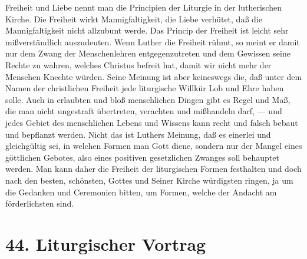 Freiheit und Liebe nennt man die Principien der Liturgie in der lutherischen Kirche. Die Freiheit wirkt Mannigfaltigkeit, die Liebe verhütet, daß die Mannigfaltigkeit nicht allzubunt werde. Das Princip der Freiheit ist leicht
sehr mißverständlich auszudeuten. Wenn Luther die Freiheit rühmt, so meint er damit nur dem Zwang der Menschenlehren entgegenzutreten und dem Gewissen seine Rechte zu wahren, welches Christus befreit hat, damit wir nicht mehr der Menschen Knechte würden. Seine Meinung ist aber keineswegs die, daß unter dem Namen der christlichen Freiheit jede liturgische Willkür Lob und Ehre haben solle. Auch in erlaubten und bloß menschlichen Dingen gibt es Regel und Maß, die man nicht ungestraft übertreten, verachten und mißhandeln darf, — und jedes Gebiet des menschlichen Lebens und Wissens kann recht und falsch bebaut und bepflanzt werden. Nicht das ist Luthers Meinung, daß es einerlei und gleichgültig sei, in welchen Formen man Gott diene, sondern nur der Mangel eines göttlichen Gebotes, also eines positiven gesetzlichen Zwanges soll behauptet werden. Man kann daher die Freiheit der liturgischen Formen festhalten und doch nach den besten, schönsten, Gottes und Seiner Kirche würdigsten ringen, ja um die Gedanken und Ceremonien bitten, um Formen, welche der Andacht am förderlichsten sind.

\section{44. Liturgischer Vortrag}


